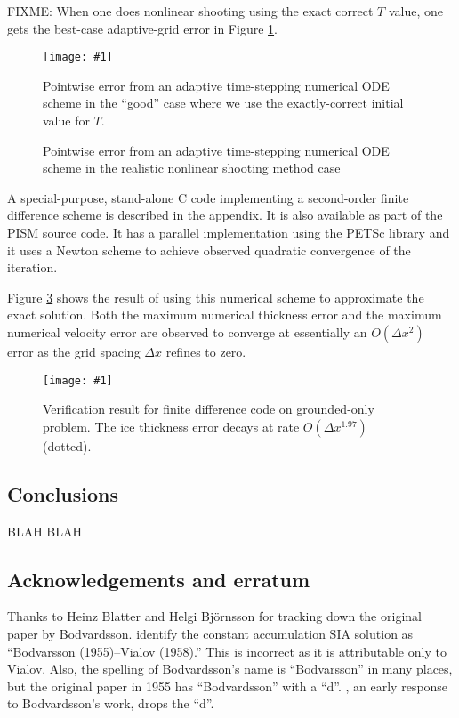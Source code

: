 \documentclass[twocolumn,letterpaper]{igs}
\newcommand{\onecol}[1]{\texttt{[image: \#1]}}
\begin{document}
FIXME:  When one does nonlinear shooting using the exact correct $T$ value, one gets the best-case adaptive-grid error in Figure \ref{fig:shoot-good-error}.

\begin{figure}[ht]
\onecol{exactmarine-good-error}
\caption{Pointwise error from an adaptive time-stepping numerical ODE scheme in the ``good'' case where we use the exactly-correct initial value for $T$.} \label{fig:shoot-good-error}
\end{figure}

\begin{figure}[ht]
\caption{Pointwise error from an adaptive time-stepping numerical ODE scheme in the realistic nonlinear shooting method case} \label{fig:shoot-error}
\end{figure}

A special-purpose, stand-alone C code implementing a second-order finite difference scheme is described in the appendix.  It is also available as part of the PISM source code.  It has a parallel implementation using the PETSc \citep{petsc-user-ref} library and it uses a Newton scheme to achieve observed quadratic convergence of the iteration.

Figure \ref{fig:verifNresult} shows the result of using this numerical scheme to approximate the exact solution.  Both the maximum numerical thickness error and the maximum numerical velocity error are observed to converge at essentially an $O(\Delta x^2)$ error as the grid spacing $\Delta x$ refines to zero.  

\begin{figure}[ht]
\onecol{verifN}
\caption{Verification result for finite difference code on grounded-only problem.  The ice thickness error decays at rate $O(\Delta x^{1.97})$ (dotted).} \label{fig:verifNresult}
\end{figure}


\subsection*{Conclusions} BLAH BLAH

\subsection*{Acknowledgements and erratum}  Thanks to Heinz Blatter and Helgi Bj\"ornsson for tracking down the original paper by Bodvardsson.  \cite{BLKCB} identify the constant accumulation SIA solution as ``Bodvarsson (1955)--Vialov (1958).''  This is incorrect as it is attributable only to Vialov.  Also, the spelling of Bodvardsson's name is ``Bodvarsson'' in many places, but the original paper in 1955 has ``Bodvardsson'' with a ``d''.  \cite{Weertman61stability}, an early response to Bodvardsson's work, drops the ``d''.
\end{document}
